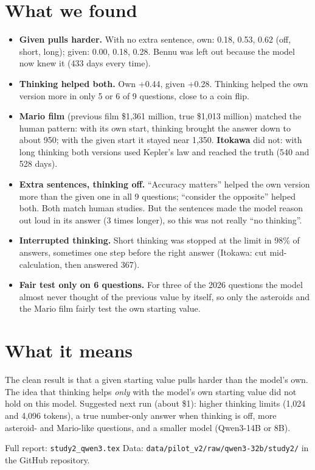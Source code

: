 \documentclass[11pt,a4paper]{article}
\begin{document}
\section*{What we found}
\begin{itemize}[leftmargin=*]
  \item \textbf{Given pulls harder.} With no extra sentence, own: 0.18, 0.53, 0.62 (off, short, long); given: 0.00, 0.18, 0.28. Bennu was left out because the model now knew it (433 days every time).
  \item \textbf{Thinking helped both.} Own +0.44, given +0.28. Thinking helped the own version more in only 5 or 6 of 9 questions, close to a coin flip.
  \item \textbf{Mario film} (previous film \$1,361 million, true \$1,013 million) matched the human pattern: with its own start, thinking brought the answer down to about 950; with the given start it stayed near 1,350. \textbf{Itokawa} did not: with long thinking both versions used Kepler's law and reached the truth (540 and 528 days).
  \item \textbf{Extra sentences, thinking off.} \enquote{Accuracy matters} helped the own version more than the given one in all 9 questions; \enquote{consider the opposite} helped both. Both match human studies. But the sentences made the model reason out loud in its answer (3 times longer), so this was not really \enquote{no thinking}.
  \item \textbf{Interrupted thinking.} Short thinking was stopped at the limit in 98\% of answers, sometimes one step before the right answer (Itokawa: cut mid-calculation, then answered 367).
  \item \textbf{Fair test only on 6 questions.} For three of the 2026 questions the model almost never thought of the previous value by itself, so only the asteroids and the Mario film fairly test the own starting value.
\end{itemize}

\section*{What it means}
The clean result is that a given starting value pulls harder than the model's own. The idea that thinking helps \emph{only} with the model's own starting value did not hold on this model. Suggested next run (about \$1): higher thinking limits (1,024 and 4,096 tokens), a true number-only answer when thinking is off, more asteroid- and Mario-like questions, and a smaller model (Qwen3-14B or 8B).

\vfill
{\small Full report: \texttt{study2\_qwen3.tex} \textperiodcentered{} Data: \texttt{data/pilot\_v2/raw/qwen3-32b/study2/} in the GitHub repository.}
\end{document}
